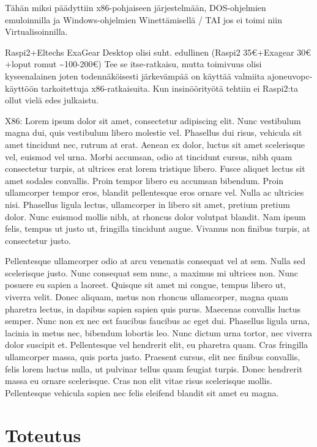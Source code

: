 \documentclass[11pt,a4paper,oneside,article]{memoir}
\begin{document}
Tähän miksi päädyttiin x86-pohjaiseen järjestelmään, DOS-ohjelmien emuloinnilla ja Windows-ohjelmien Winettämisellä / TAI jos ei toimi niin
Virtualisoinnilla.

Raspi2+Eltechs ExaGear Desktop olisi suht. edullinen (Raspi2 35€+Exagear 30€+loput romut  \textasciitilde{}100-200€) Tee se itse-ratkaisu, mutta toimivuus olisi kyseenalainen joten todennäköisesti järkevämpää on käyttää valmiita ajoneuvopc-käyttöön tarkoitettuja x86-ratkaisuita. Kun insinöörityötä tehtiin ei Raspi2:ta ollut vielä edes julkaistu.

X86: Lorem ipsum dolor sit amet, consectetur adipiscing elit. Nunc
vestibulum magna dui, quis vestibulum libero molestie vel. Phasellus dui
risus, vehicula sit amet tincidunt nec, rutrum at erat. Aenean ex dolor,
luctus sit amet scelerisque vel, euismod vel urna. Morbi accumsan, odio
at tincidunt cursus, nibh quam consectetur turpis, at ultrices erat
lorem tristique libero. Fusce aliquet lectus sit amet sodales convallis.
Proin tempor libero eu accumsan bibendum. Proin ullamcorper tempor eros,
blandit pellentesque eros ornare vel. Nulla ac ultricies nisi. Phasellus
ligula lectus, ullamcorper in libero sit amet, pretium pretium dolor.
Nunc euismod mollis nibh, at rhoncus dolor volutpat blandit. Nam ipsum
felis, tempus ut justo ut, fringilla tincidunt augue. Vivamus non
finibus turpis, at consectetur justo.

Pellentesque ullamcorper odio at arcu venenatis consequat vel at sem.
Nulla sed scelerisque justo. Nunc consequat sem nunc, a maximus mi
ultrices non. Nunc posuere eu sapien a laoreet. Quisque sit amet mi
congue, tempus libero ut, viverra velit. Donec aliquam, metus non
rhoncus ullamcorper, magna quam pharetra lectus, in dapibus sapien
sapien quis purus. Maecenas convallis luctus semper. Nunc non ex nec est
faucibus faucibus ac eget dui. Phasellus ligula urna, lacinia in metus
nec, bibendum lobortis leo. Nunc dictum urna tortor, nec viverra dolor
suscipit et. Pellentesque vel hendrerit elit, eu pharetra quam. Cras
fringilla ullamcorper massa, quis porta justo. Praesent cursus, elit nec
finibus convallis, felis lorem luctus nulla, ut pulvinar tellus quam
feugiat turpis. Donec hendrerit massa eu ornare scelerisque. Cras non
elit vitae risus scelerisque mollis. Pellentesque vehicula sapien nec
felis eleifend blandit sit amet eu magna.

\chapter{Toteutus}
\end{document}
